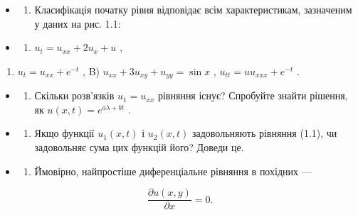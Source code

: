 \documentclass[
  ukrainian,
]{article}
\providecommand{\tightlist}{%
  \setlength{\itemsep}{0pt}\setlength{\parskip}{0pt}}
\begin{document}
\begin{itemize}
\tightlist
\item
  \begin{enumerate}
  \def\labelenumi{\arabic{enumi}.}
  \tightlist
  \item
    Класифікація початку рівня відповідає всім характеристикам,
    зазначеним у даних на рис. 1.1:
  \end{enumerate}
\item
  \begin{enumerate}
  \def\labelenumi{\alph{enumi})}
  \tightlist
  \item
    \(u_t = u_{xx} + 2u_x + u\) ,
  \end{enumerate}
\end{itemize}

\begin{enumerate}
\def\labelenumi{\arabic{enumi})}
\setcounter{enumi}{5}
\tightlist
\item
  \(u_t = u_{xx} + e^{-t}\) , B) \(u_{xx} + 3u_{xy} + u_{yy} = \sin x\)
  , \(u_{tt} = uu_{xxx} + e^{-t}\) .
\end{enumerate}

\begin{itemize}
\tightlist
\item
  \begin{enumerate}
  \def\labelenumi{\arabic{enumi}.}
  \setcounter{enumi}{1}
  \tightlist
  \item
    Скільки розв'язків \(u_1 = u_{xx}\) рівняння існує? Спробуйте знайти
    рішення, як \(u(x, t) = e^{a\lambda + bt}\) .
  \end{enumerate}
\item
  \begin{enumerate}
  \def\labelenumi{\arabic{enumi}.}
  \setcounter{enumi}{2}
  \tightlist
  \item
    Якщо функції \(u_1(x, t)\) і \(u_2(x, t)\) задовольняють рівняння
    (1.1), чи задовольняє сума цих функцій його? Доведи це.
  \end{enumerate}
\item
  \begin{enumerate}
  \def\labelenumi{\arabic{enumi}.}
  \setcounter{enumi}{3}
  \tightlist
  \item
    Ймовірно, найпростіше диференціальне рівняння в похідних ---
  \end{enumerate}
\end{itemize}

\[
\frac{\partial u(x, y)}{\partial x} = 0.
\]
\end{document}
